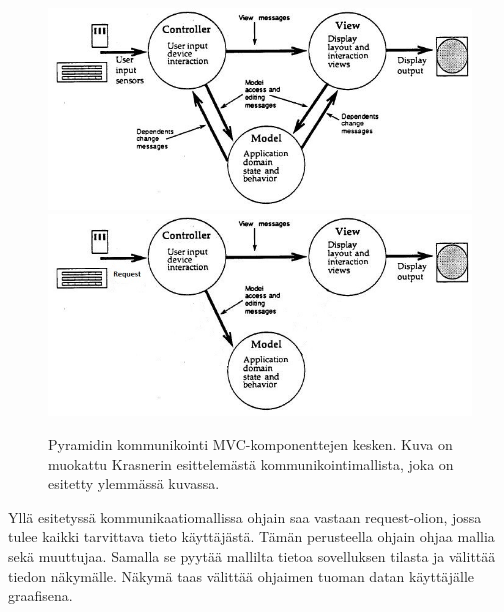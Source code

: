 \documentclass[finnish,utf8,nonumbib,palatino,kandi]{gradu2}
\begin{document}
\begin{figure}[h]
\centering
\includegraphics[scale=0.3]{krasner_mvc.jpg}
\includegraphics[scale=0.85]{pyramid_mvc.jpg}
\caption{Pyramidin kommunikointi MVC-komponenttejen kesken. Kuva on muokattu Krasnerin esittelemästä kommunikointimallista, joka on esitetty ylemmässä kuvassa.  }
\end{figure}

Yllä esitetyssä kommunikaatiomallissa ohjain saa vastaan request-olion, jossa tulee kaikki tarvittava tieto käyttäjästä. Tämän perusteella ohjain ohjaa mallia
sekä muuttujaa. Samalla se pyytää mallilta tietoa sovelluksen tilasta ja välittää tiedon näkymälle. Näkymä taas välittää ohjaimen tuoman datan käyttäjälle graafisena.
\end{document}

